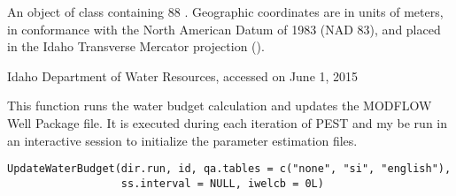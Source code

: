 \documentclass[letterpaper]{book}
\begin{document}
%
\begin{Format}
An object of  class containing 88 .
Geographic coordinates are in units of meters, in conformance with the North American Datum of 1983 (NAD 83), and placed in the
Idaho Transverse Mercator projection ().
\end{Format}
%
\begin{Source}\relax
Idaho Department of Water Resources, accessed on June 1, 2015
\end{Source}
%
\begin{Examples}
\end{Examples}
%
\begin{Description}\relax
This function runs the water budget calculation and updates the MODFLOW Well Package file.
It is executed during each iteration of PEST and my be run in an interactive \R{} session to initialize the parameter estimation files.
\end{Description}
%
\begin{Usage}
\begin{verbatim}
UpdateWaterBudget(dir.run, id, qa.tables = c("none", "si", "english"),
                  ss.interval = NULL, iwelcb = 0L)
\end{verbatim}
\end{Usage}
%
\end{document}
